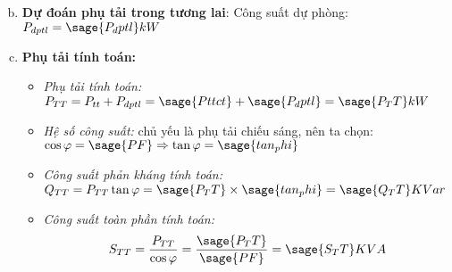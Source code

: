 \begin{enumerate}[a.]
\begin{equation*}
\end{equation*}
\item \textbf{Dự đoán phụ tải trong tương lai}: Công suất dự phòng: $P_{dptl}=\sage{P_dptl}kW$
\item \textbf{Phụ tải tính toán:}
\begin{itemize}
\item \textit{Phụ tải tính toán:}  $P_{TT} = P_{tt}+P_{dptl} = \sage{Pttct}+\sage{P_dptl} = \sage{P_TT}kW$
\item \textit{Hệ số công suất:} chủ yếu là phụ tải chiếu sáng, nên ta chọn: $\cos \varphi = \sage{PF} \Rightarrow \tan \varphi = \sage{tan_phi}$
\item \textit{Công suất phản kháng tính toán:} $Q_{TT}=P_{TT}\tan \varphi = \sage{P_TT}\times \sage{tan_phi}=\sage{Q_TT}KVar$
\item \textit{Công suất toàn phần tính toán:} $$S_{TT} = \frac{P_{TT}}{\cos \varphi}=\frac{\sage{P_TT}}{\sage{PF}}=\sage{S_TT}KVA$$
\end{itemize}
\end{enumerate}